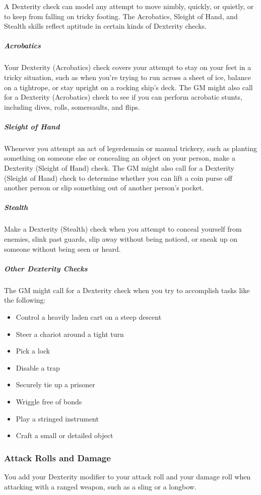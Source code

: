 A Dexterity check can model any attempt to move nimbly, quickly, or quietly, or to keep from falling on tricky footing. The Acrobatics, Sleight of Hand, and Stealth skills reflect aptitude in certain kinds of Dexterity checks.

\subparagraph*{Acrobatics} Your Dexterity (Acrobatics) check covers your attempt to stay on your feet in a tricky situation, such as when you're trying to run across a sheet of ice, balance on a tightrope, or stay upright on a rocking ship's deck. The GM might also call for a Dexterity (Acrobatics) check to see if you can perform acrobatic stunts, including dives, rolls, somersaults, and flips.

\subparagraph*{Sleight of Hand} Whenever you attempt an act of legerdemain or manual trickery, such as planting something on someone else or concealing an object on your person, make a Dexterity (Sleight of Hand) check. The GM might also call for a Dexterity (Sleight of Hand) check to determine whether you can lift a coin purse off another person or slip something out of another person's pocket.

\subparagraph*{Stealth} Make a Dexterity (Stealth) check when you attempt to conceal yourself from enemies, slink past guards, slip away without being noticed, or sneak up on someone without being seen or heard.

\subparagraph*{Other Dexterity Checks} The GM might call for a Dexterity check when you try to accomplish tasks like the following:

\begin{itemize}
\item Control a heavily laden cart on a steep descent
\item Steer a chariot around a tight turn
\item Pick a lock
\item Disable a trap
\item Securely tie up a prisoner
\item Wriggle free of bonds
\item Play a stringed instrument
\item Craft a small or detailed object
\end{itemize}

\subsubsection{Attack Rolls and Damage}

You add your Dexterity modifier to your attack roll and your damage roll when attacking with a ranged weapon, such as a sling or a longbow.

